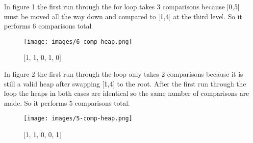 \documentclass{article}
\begin{document}
In figure 1 the first run through the for loop takes 3 comparisons because [0,5] must be moved all the way down and compared to [1,4] at the third level. So it performs 6 comparisons total\\
\begin{figure}
\centering
\texttt{[image: images/6-comp-heap.png]}
\caption{[1, 1, 0, 1, 0] \label{overflow}}
\end{figure}
In figure 2 the first run through the loop only takes 2 comparisons because it is still a valid heap after swapping [1,4] to the root.  After the first run through the loop the heaps in both cases are identical so the same number of comparisons are made. So it performs 5 comparisons total.
\begin{figure}
\centering
\texttt{[image: images/5-comp-heap.png]}
\caption{[1, 1, 0, 0, 1] \label{overflow}}
\end{figure}\\\\\\\\
\end{document}

